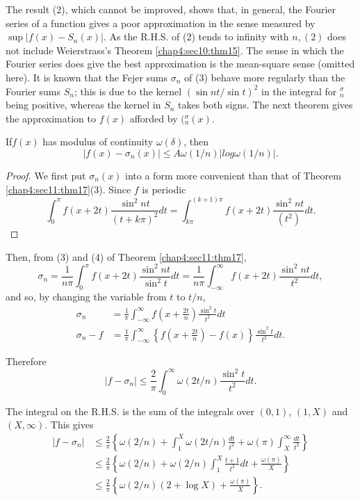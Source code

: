 The result (2), which cannot be improved, shows that, in general,
the Fourier series of a function gives a poor approximation in the
sense measured by $\sup|f(x) -S_n (x) |$. As the R.H.S. of (2) tends
to infinity with $n,(2)$ does not include Weierstrass's Theorem
\ref{chap4:sec10:thm15}. The sense in which the Fourier series does
give the best 
approximation is the mean-square sense (omitted here). It is known
that the Fejer sums $\sigma_n$ of (3) behave more regularly than the
Fourier sums $S_n$; this is due to the kernel $(\sin nt / \sin t)^2$
in the integral for ${}^\sigma_ n$  being positive, whereas the kernel in
$S_n$ takes both signs. The next theorem gives the approximation to
$f(x)$ afforded by $({}^\sigma_n (x)$.  

\begin{theorem}\label{chap4:sec11:thm18}%
  If\pageoriginale $f(x)$ has modulus of continuity $\omega (\delta)$, then 
  $$
  |f(x) - \sigma_n (x) | \leq A \omega (1/n) | log \omega (1/ n) |.
  $$
\end{theorem}

\begin{proof}
  We first put $\sigma_n(x)$ into a form more convenient than that of
  Theorem \ref{chap4:sec11:thm17}(3). Since $f$ is periodic 
  $$
  \int^{\pi}_0 f(x + 2t) \frac{\sin ^2 nt}{(t+k\pi)^2}dt =
  \int^{(k+1)\pi}_{k \pi}f(x + 2t) \frac{\sin ^2 nt}{(t^2)} dt. 
  $$
\end{proof} 

Then, from (3) and (4) of Theorem \ref{chap4:sec11:thm17},
$$
\sigma_n = \frac{1}{n \pi} \int^{\pi}_0 f(x + 2t) \frac{\sin ^2
  nt}{\sin^2t}dt = \frac{1}{n \pi} \int^{\infty}_{-\infty} f(x + 2t)
\frac{\sin ^2 nt}{t^2}dt, 
$$
and so, by changing the variable from $t$ to $t/n$,
\begin{align*}
  \sigma_n & = \frac{1}{\pi} \int^{\infty}_{-\infty} f(x+
  \frac{2t}{n}) \frac{\sin ^2 t}{t^2}dt \\ 
  \sigma_n -f & = \frac{1}{\pi} \int^{\infty}_{-\infty} \left\{f(x+
  \frac{2t}{n}) -f(x) \right\}\frac{\sin ^2 t}{t^2}dt. 
\end{align*}

Therefore 
$$
|f-\sigma_n| \leq \frac{2}{\pi} \int^{\infty}_{0} \omega (2t/n)
\frac{\sin ^2 t}{t^2}dt. 
$$

The integral on the R.H.S. is the sum of the integrals over
$(0,1)$, $(1,X)$ and $(X,\infty)$. This gives  
\begin{align*}
  |f - \sigma_n| & \leq \frac{2}{\pi}\left\{\omega(2/n) + \int^X_1 \omega
  (2t/n) \frac{dt}{t^2} + \omega (\pi) \int^{\infty}_X \frac{dt}{t^2}
  \right\}\\ 
  & \leq \frac{2}{\pi}\left\{\omega(2/n) + \omega (2/n) \int^X_1
  \frac{t+1}{t^2} dt+ \frac{\omega (\pi)}{X}\right\}\\ 
  & \leq \frac{2}{\pi} \left\{\omega(2/n) (2 + \log X) + \frac{\omega
    (\pi)}{X} \right\}. 
\end{align*}

